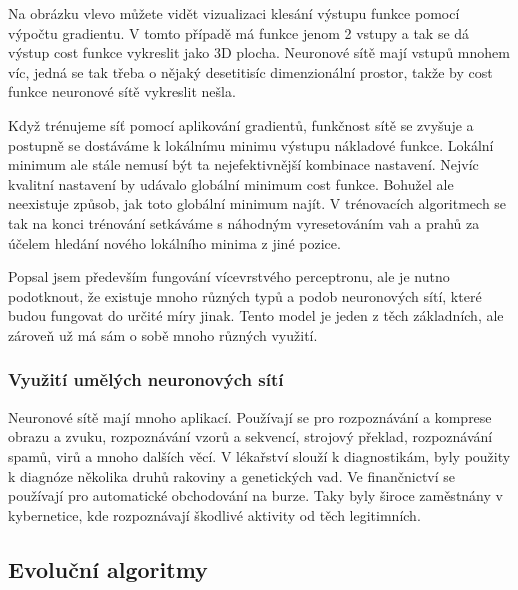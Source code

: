 \documentclass[a4paper,11pt, oneside]{book} \usepackage[czech]{babel}
\begin{document}
	Na obrázku vlevo můžete vidět vizualizaci klesání výstupu funkce pomocí výpočtu gradientu. V tomto případě
	má funkce jenom 2 vstupy a tak se dá výstup cost funkce vykreslit jako 3D plocha.
	Neuronové sítě mají vstupů mnohem víc, jedná se tak třeba o nějaký desetitisíc
	dimenzionální prostor, takže by cost funkce neuronové sítě vykreslit nešla.

	Když trénujeme síť pomocí aplikování gradientů, funkčnost sítě se zvyšuje a postupně se dostáváme
	k lokálnímu minimu výstupu nákladové funkce. Lokální minimum ale stále nemusí být ta nejefektivnější
	kombinace nastavení. Nejvíc kvalitní nastavení by udávalo globální minimum cost funkce.
	Bohužel ale neexistuje způsob, jak toto globální minimum najít.
	V trénovacích algoritmech se tak na konci trénování setkáváme s náhodným vyresetováním vah a
	prahů za účelem hledání nového lokálního minima z jiné pozice.

	Popsal jsem především fungování vícevrstvého perceptronu, ale je nutno podotknout,
	že existuje mnoho různých typů a podob neuronových sítí, které budou fungovat
	do určité míry jinak. Tento model je jeden z těch základních, ale zároveň už má
	sám o sobě mnoho různých využití.

	\subsubsection{Využití umělých neuronových sítí}

	Neuronové sítě mají mnoho aplikací. Používají se pro rozpoznávání a komprese obrazu a
	zvuku, rozpoznávání vzorů a sekvencí, strojový překlad, rozpoznávání spamů, virů a mnoho
	dalších věcí. V lékařství slouží k diagnostikám, byly použity k diagnóze
	několika druhů rakoviny a genetických vad. Ve finančnictví se používají pro
	automatické obchodování na burze. Taky byly široce zaměstnány v kybernetice,
	kde rozpoznávají škodlivé aktivity od těch legitimních.

	\subsection{Evoluční algoritmy}
\end{document}
